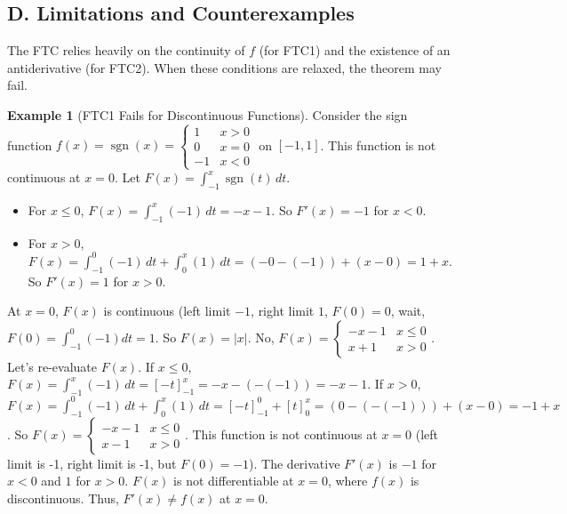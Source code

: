 \documentclass[11pt, a4paper]{article}
\theoremstyle{plain} %
\theoremstyle{definition} %
\newtheorem{example}[theorem]{Example}
\theoremstyle{remark} %
\DeclareMathOperator{\sgn}{sgn}
\begin{document}
\subsection{D. Limitations and Counterexamples}

The FTC relies heavily on the continuity of \( f \) (for FTC1) and the existence of an antiderivative (for FTC2). When these conditions are relaxed, the theorem may fail.

\begin{example}[FTC1 Fails for Discontinuous Functions]
    Consider the sign function \( f(x) = \sgn(x) = \begin{cases} 1 & x > 0 \\ 0 & x = 0 \\ -1 & x < 0 \end{cases} \) on \( [-1,1] \).
    This function is not continuous at \( x=0 \).
    Let \( F(x) = \int_{-1}^x \sgn(t) \, dt \).
    \begin{itemize}
        \item For \( x \le 0 \), \( F(x) = \int_{-1}^x (-1) \, dt = -x - 1 \). So \( F'(x) = -1 \) for \( x < 0 \).
        \item For \( x > 0 \), \( F(x) = \int_{-1}^0 (-1) \, dt + \int_0^x (1) \, dt = (-0 - (-1)) + (x - 0) = 1 + x \). So \( F'(x) = 1 \) for \( x > 0 \).
    \end{itemize}
    At \( x=0 \), \( F(x) \) is continuous (left limit \( -1 \), right limit \( 1 \), \( F(0)=0 \), wait, \( F(0) = \int_{-1}^0 (-1) dt = 1 \). So \( F(x) = |x| \). No, \( F(x) = \begin{cases} -x-1 & x \le 0 \\ x+1 & x > 0 \end{cases} \).
    Let's re-evaluate \( F(x) \).
    If \( x \le 0 \), \( F(x) = \int_{-1}^x (-1) \, dt = [-t]_{-1}^x = -x - (-(-1)) = -x-1 \).
    If \( x > 0 \), \( F(x) = \int_{-1}^0 (-1) \, dt + \int_0^x (1) \, dt = [-t]_{-1}^0 + [t]_0^x = (0 - (-(-1))) + (x - 0) = -1 + x \).
    So \( F(x) = \begin{cases} -x-1 & x \le 0 \\ x-1 & x > 0 \end{cases} \).
    This function is not continuous at \( x=0 \) (left limit is -1, right limit is -1, but \( F(0)=-1 \)).
    The derivative \( F'(x) \) is \( -1 \) for \( x<0 \) and \( 1 \) for \( x>0 \). \( F(x) \) is not differentiable at \( x=0 \), where \( f(x) \) is discontinuous. Thus, \( F'(x) \ne f(x) \) at \( x=0 \).
\end{example}
\end{document}
